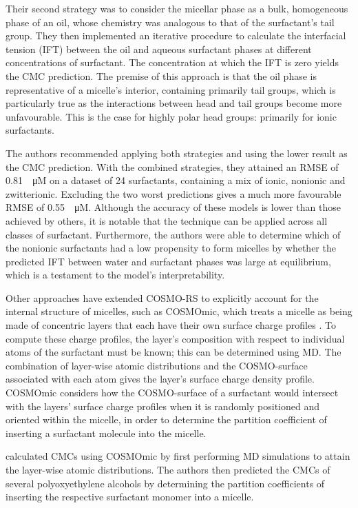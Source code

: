 Their second strategy was to consider the micellar phase as a bulk, homogeneous
phase of an oil, whose chemistry was analogous to that of the surfactant's tail
group. They then implemented an iterative procedure to calculate the interfacial
tension (IFT) between the oil and aqueous surfactant phases at different
concentrations of surfactant. The concentration at which the IFT is zero yields
the CMC prediction. The premise of this approach is that the oil phase is
representative of a micelle's interior, containing primarily tail groups, which
is particularly true as the interactions between head and tail groups become
more unfavourable. This is the case for highly polar head groups: primarily for
ionic surfactants.

The authors recommended applying both strategies and using the lower result as
the CMC prediction. With the combined strategies, they attained an RMSE of
\SI{0.81}{\log \micro M} on a dataset of 24 surfactants, containing a mix of
ionic, nonionic and zwitterionic. Excluding the two worst predictions gives a
much more favourable RMSE of \SI{0.55}{\log \micro M}. Although the accuracy of
these models is lower than those achieved by others, it is notable that the
technique can be applied across all classes of surfactant. Furthermore, the
authors were able to determine which of the nonionic surfactants had a low
propensity to form micelles by whether the predicted IFT between water and
surfactant phases was large at equilibrium, which is a testament to the model's
interpretability.

Other approaches have extended COSMO-RS to explicitly account for the internal
structure of micelles, such as COSMOmic, which treats a micelle as being made of
concentric layers that each have their own surface charge profiles
\cite{klamtCOSMOmicMechanisticApproach2008}. To compute these charge profiles,
the layer's composition with respect to individual atoms of the surfactant must
be known; this can be determined using MD. The combination of layer-wise atomic
distributions and the COSMO-surface associated with each atom gives the layer's
surface charge density profile. COSMOmic considers how the COSMO-surface of a
surfactant would intersect with the layers' surface charge profiles when it is
randomly positioned and oriented within the micelle, in order to determine the
partition coefficient of inserting a surfactant molecule into the micelle.

\citet{jakobtorweihenPredictingCriticalMicelle2017} calculated CMCs using
COSMOmic by first performing MD simulations to attain the layer-wise atomic
distributions. The authors then predicted the CMCs of several polyoxyethylene
alcohols by determining the partition coefficients of inserting the respective
surfactant monomer into a micelle.

